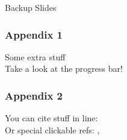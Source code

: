\documentclass[mathserif, fleqn, aspectratio=169]{beamer}
\begin{document}
%         

\appendix
\backupbegin

\begin{frame}[plain]
  \begin{center}
    {\Huge{}Backup Slides}
  \end{center}
\end{frame}

\begin{frame}\frametitle{Appendix 1}
  Some extra stuff\\[2ex]
  Take a look at the progress bar!
\end{frame}

\begin{frame}\frametitle{Appendix 2}
  You can cite stuff in line: \\
  Or special clickable refs: , 
\end{frame}

\backupend
\end{document}
